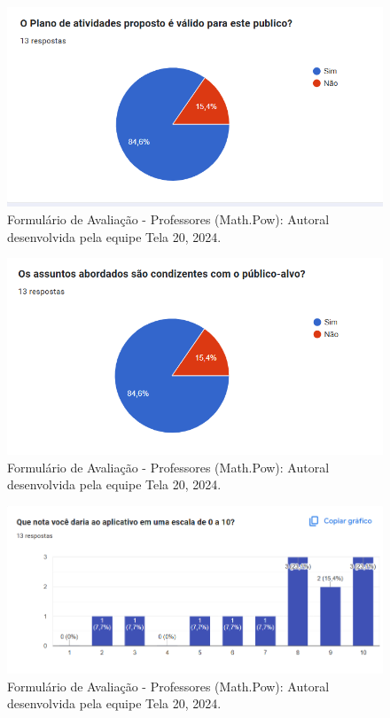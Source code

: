 \documentclass[12pt, openany, oneside, a4paper, english, brazil]{abntex2}   %
\begin{document}
\begin{figure}
    \centering
    \includegraphics{figuras/Formulário Gráficos/Professores/8 O plano de atividades proposto e valido.png}
    \caption{Formulário de Avaliação - Professores (Math.Pow):  Autoral desenvolvida pela equipe Tela 20, 2024.}
    \label{gráfico gerado pelo formulário}
\end{figure}


\begin{figure}
    \centering
    \includegraphics{figuras/Formulário Gráficos/Professores/9 Os assuntos abordados sao condizentes com o publico-alvo.png}
    \caption{Formulário de Avaliação - Professores (Math.Pow):  Autoral desenvolvida pela equipe Tela 20, 2024.}
    \label{gráfico gerado pelo formulário}
\end{figure}

\begin{figure}
    \centering
    \includegraphics{figuras/Formulário Gráficos/Professores/10 Que nota voce daria.png}
    \caption{Formulário de Avaliação - Professores (Math.Pow):  Autoral desenvolvida pela equipe Tela 20, 2024.}
    \label{gráfico gerado pelo formulário}
\end{figure}
\end{document}
